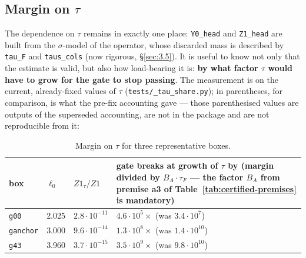 \subsection{Margin on $\tau$}\label{sec:3.7}

The dependence on $\tau$ remains in exactly one place: \texttt{Y0\_head} and \texttt{Z1\_head} are built from the $\sigma$-model of the operator, whose discarded mass is described by \texttt{tau\_F} and \texttt{taus\_cols} (now rigorous, \S\ref{sec:3.5}). It is useful to know not only that the estimate is valid, but also how load-bearing it is: \textbf{by what factor $\tau$ would have to grow for the gate to stop passing}. The measurement is on the current, already-fixed values of $\tau$ (\texttt{tests/\allowbreak \_\allowbreak tau\_\allowbreak share.py}); in parentheses, for comparison, is what the pre-fix accounting gave --- those parenthesised values are outputs of the superseded accounting, are not in the package and are not reproducible from it:

\begin{table}[h]
\centering
\caption{Margin on $\tau$ for three representative boxes.}\label{tab:3.7-tau}
{\small\setlength{\tabcolsep}{4pt}
\begin{tabular}{lll>{\raggedright\arraybackslash}p{}}
\toprule
box & $\ell_{0}$ & $Z1_{\tau} / Z1$ & gate breaks at growth of $\tau$ by (margin divided by $B_{A}\cdot \tau_{F}$ --- the factor $B_{A}$ from premise a3 of Table~\ref{tab:certified-premises} is mandatory) \\
\midrule
\texttt{g00} & 2.025 & $2.8\cdot 10^{-11}$ & $4.6\cdot 10^{5}\times$ (was $3.4\cdot 10^{7}$) \\
\texttt{ganchor} & 3.000 & $9.6\cdot 10^{-14}$ & $1.3\cdot 10^{8}\times$ (was $1.4\cdot 10^{10}$) \\
\texttt{g43} & 3.960 & $3.7\cdot 10^{-15}$ & $3.5\cdot 10^{9}\times$ (was $9.8\cdot 10^{10}$) \\
\bottomrule
\end{tabular}}
\end{table}

